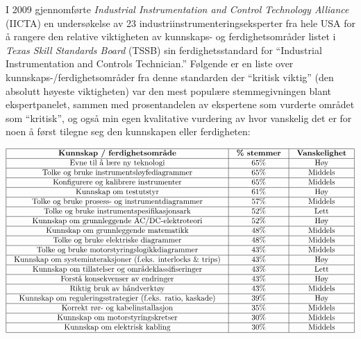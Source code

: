 \vskip 10pt

I 2009 gjennomførte {\it Industrial Instrumentation and Control Technology Alliance} (IICTA) en undersøkelse av 23 industriinstrumenteringseksperter fra hele USA for å rangere den relative viktigheten av kunnskaps- og ferdighetsområder listet i {\it Texas Skill Standards Board} (TSSB) sin ferdighetsstandard for ``Industrial Instrumentation and Controls Technician.''  Følgende er en liste over kunnskaps-/ferdighetsområder fra denne standarden der ``kritisk viktig'' (den absolutt høyeste viktigheten) var den mest populære stemmegivningen blant ekspertpanelet, sammen med prosentandelen av ekspertene som vurderte området som ``kritisk'', og også min egen kvalitative vurdering av hvor vanskelig det er for noen å først tilegne seg den kunnskapen eller ferdigheten:


$$\vbox{\offinterlineskip
\halign{\strut
\vrule \quad\hfil # \ \hfil & 
\vrule \quad\hfil # \ \hfil & 
\vrule \quad\hfil # \ \hfil \vrule \cr
\noalign{\hrule}
%
{\bf Kunnskap / ferdighetsområde} & {\bf \% stemmer} & {\bf Vanskelighet} \cr
%
\noalign{\hrule}
%
Evne til å lære ny teknologi & 65\% & Høy \cr
%
\noalign{\hrule}
%
Tolke og bruke instrumentsløyfediagrammer & 65\% & Middels \cr
%
\noalign{\hrule}
%
Konfigurere og kalibrere instrumenter & 65\% & Middels \cr
%
\noalign{\hrule}
%
Kunnskap om testutstyr & 61\% & Høy \cr
%
\noalign{\hrule}
%
Tolke og bruke prosess- og instrumentdiagrammer & 57\% & Middels \cr
%
\noalign{\hrule}
%
Tolke og bruke instrumentspesifikasjonsark & 52\% & Lett \cr
%
\noalign{\hrule}
%
Kunnskap om grunnleggende AC/DC-elektroteori & 52\% & Høy \cr
%
\noalign{\hrule}
%
Kunnskap om grunnleggende matematikk & 48\% & Middels \cr
%
\noalign{\hrule}
%
Tolke og bruke elektriske diagrammer & 48\% & Middels \cr
%
\noalign{\hrule}
%
Tolke og bruke motorstyringslogikkdiagrammer & 43\% & Middels \cr
%
\noalign{\hrule}
%
Kunnskap om systeminteraksjoner (f.eks. interlocks \& trips) & 43\% & Høy \cr
%
\noalign{\hrule}
%
Kunnskap om tillatelser og områdeklassifiseringer & 43\% & Lett \cr
%
\noalign{\hrule}
%
Forstå konsekvenser av endringer & 43\% & Høy \cr
%
\noalign{\hrule}
%
Riktig bruk av håndverktøy & 43\% & Middels \cr
%
\noalign{\hrule}
%
Kunnskap om reguleringsstrategier (f.eks. ratio, kaskade) & 39\% & Høy \cr
%
\noalign{\hrule}
%
Korrekt rør- og kabelinstallasjon & 35\% & Middels \cr
%
\noalign{\hrule}
%
Kunnskap om motorstyringskretser & 30\% & Middels \cr
%
\noalign{\hrule}
%
Kunnskap om elektrisk kabling & 30\% & Middels \cr
%
\noalign{\hrule}
} %
}$$ %

